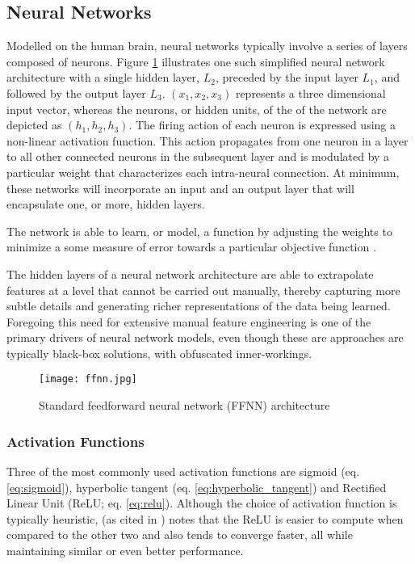 \documentclass[../../fyp.tex]{subfiles}
\begin{document}
\subsection{Neural Networks}
Modelled on the human brain, neural networks typically involve a series of layers composed of neurons. Figure \ref{fig:ffnn} illustrates one such simplified neural network architecture with a single hidden layer, $L_2$, preceded by the input layer $L_1$, and followed by the output layer $L_3$. $(x_1, x_2, x_3)$ represents a three dimensional input vector, whereas the neurons, or hidden units, of the of the network are depicted as $(h_1, h_2, h_3)$. The firing action of each neuron is expressed using a non-linear activation function. This action propagates from one neuron in a layer to all other connected neurons in the subsequent layer and is modulated by a particular weight that characterizes each intra-neural connection. At minimum, these networks will incorporate an input and an output layer that will encapsulate one, or more, hidden layers.

The network is able to learn, or model, a function by adjusting the weights to minimize a some measure of error towards a particular objective function \cite{graves2012b}.

The hidden layers of a neural network architecture are able to extrapolate features at a level that cannot be carried out manually, thereby capturing more subtle details and generating richer representations of the data being learned. Foregoing this need for extensive manual feature engineering is one of the primary drivers of neural network models, even though these are approaches are typically black-box solutions, with obfuscated inner-workings.

\begin{figure}[!ht]
	\centering
	\texttt{[image: ffnn.jpg]}
	\caption{Standard feedforward neural network (FFNN) architecture \cite{zhang2018}}
	\label{fig:ffnn}
\end{figure}

\subsubsection{Activation Functions}
Three of the most commonly used activation functions are sigmoid (eq. \ref{eq:sigmoid}), hyperbolic tangent (eq. \ref{eq:hyperbolic_tangent}) and Rectified Linear Unit (ReLU; eq. \ref{eq:relu}). Although the choice of activation function is typically heuristic, \citet{glorot2011} (as cited in \cite{zhang2018}) notes that the ReLU is easier to compute when compared to the other two and also tends to converge faster, all while maintaining similar or even better performance.
\end{document}

